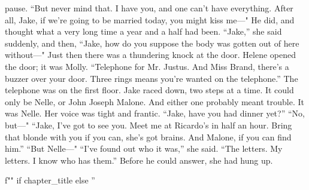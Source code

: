 \documentclass{novel}
\begin{document}
pause. “But never mind that. I have you, and one can’t have everything. After all, Jake, if we’re going to be married today, you might kiss me—" He did, and thought what a very long time a year and a half had been. “Jake,” she said suddenly, and then, “Jake, how do you suppose the body was gotten out of here without—" Just then there was a thundering knock at the door. Helene opened the door; it was Molly. “Telephone for Mr. Justus. And Miss Brand, there’s a buzzer over your door. Three rings means you’re wanted on the telephone.” The telephone was on the first floor. Jake raced down, two steps at a time. It could only be Nelle, or John Joseph Malone. And either one probably meant trouble. It was Nelle. Her voice was tight and frantic. “Jake, have you had dinner yet?” “No, but—" “Jake, I've got to see you. Meet me at Ricardo’s in half an hour. Bring that blonde with you if you can, she’s got brains. And Malone, if you can find him.” “But Nelle—" “I've found out who it was,” she said. “The letters. My letters. I know who has them.” Before he could answer, she had hung up.

\begin{ChapterStart}
\vspace{3\nbs}
f"" if chapter_title else ''
\end{ChapterStart}
\end{document}
